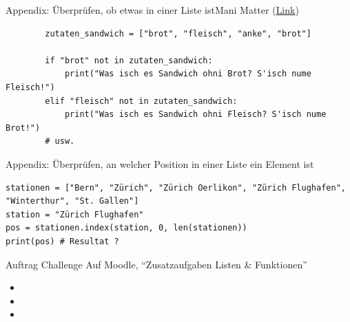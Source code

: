 \begin{frame}[fragile]{Appendix: Überprüfen, ob etwas in einer Liste ist}{Mani Matter (\href{https://youtu.be/gQbF9Ck1ccc?feature=shared}{Link})}
	
	\begin{lstlisting}
		zutaten_sandwich = ["brot", "fleisch", "anke", "brot"]
		
		if "brot" not in zutaten_sandwich:
			print("Was isch es Sandwich ohni Brot? S'isch nume Fleisch!")
		elif "fleisch" not in zutaten_sandwich:
			print("Was isch es Sandwich ohni Fleisch? S'isch nume Brot!")
		# usw. 
	\end{lstlisting}
\end{frame}

\begin{frame}[fragile]{Appendix: Überprüfen, an welcher Position in einer Liste ein Element ist}
	
\begin{lstlisting}
stationen = ["Bern", "Zürich", "Zürich Oerlikon", "Zürich Flughafen", "Winterthur", "St. Gallen"]
station = "Zürich Flughafen"
pos = stationen.index(station, 0, len(stationen))
print(pos) # Resultat ?
\end{lstlisting}
\end{frame}

\begin{frame}[fragile]{Auftrag}{ Challenge}
Auf Moodle, ``Zusatzaufgaben Listen \& Funktionen''
\begin{itemize}
	\item {}
	\item {}
	\item {}
\end{itemize}
\end{frame}